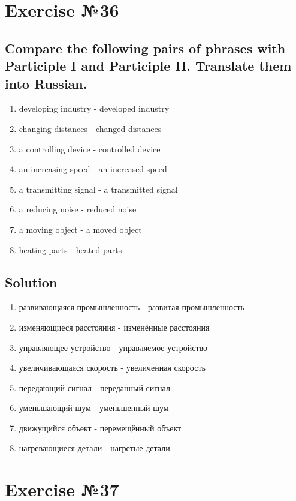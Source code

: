 \section{Exercise №36}
\subsection*{Compare the following pairs of phrases with Participle I and Participle II. Translate
      them into Russian.}
\begin{enumerate}
      \item developing industry - developed industry
      \item changing distances - changed distances
      \item a controlling device - controlled device
      \item an increasing speed - an increased speed
      \item a transmitting signal - a transmitted signal
      \item a reducing noise - reduced noise
      \item a moving object - a moved object
      \item heating parts - heated parts
\end{enumerate}

\subsection*{Solution}
\begin{enumerate}
      \item развивающаяся промышленность - развитая промышленность
      \item изменяющиеся расстояния - изменённые расстояния
      \item управляющее устройство - управляемое устройство
      \item увеличивающаяся скорость - увеличенная скорость
      \item передающий сигнал - переданный сигнал
      \item уменьшающий шум - уменьшенный шум
      \item движущийся объект - перемещённый объект
      \item нагревающиеся детали -  нагретые детали
\end{enumerate}

\section{Exercise №37}
